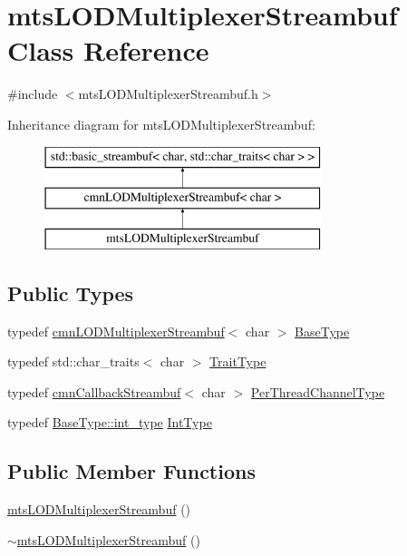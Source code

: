 \hypertarget{classmts_l_o_d_multiplexer_streambuf}{}\section{mts\+L\+O\+D\+Multiplexer\+Streambuf Class Reference}
\label{classmts_l_o_d_multiplexer_streambuf}


{\ttfamily \#include $<$mts\+L\+O\+D\+Multiplexer\+Streambuf.\+h$>$}

Inheritance diagram for mts\+L\+O\+D\+Multiplexer\+Streambuf\+:\begin{figure}[H]
\begin{center}
\leavevmode
\includegraphics[height=3.000000cm]{d3/dd6/classmts_l_o_d_multiplexer_streambuf}
\end{center}
\end{figure}
\subsection*{Public Types}
\begin{DoxyCompactItemize}
\item 
typedef \hyperlink{classcmn_l_o_d_multiplexer_streambuf}{cmn\+L\+O\+D\+Multiplexer\+Streambuf}$<$ char $>$ \hyperlink{classmts_l_o_d_multiplexer_streambuf_a61c8f5498c012321fdc38e97a43393a2}{Base\+Type}
\item 
typedef std\+::char\+\_\+traits$<$ char $>$ \hyperlink{classmts_l_o_d_multiplexer_streambuf_aad2a9ad3c0067d2f8cde938845daa252}{Trait\+Type}
\item 
typedef \hyperlink{classcmn_callback_streambuf}{cmn\+Callback\+Streambuf}$<$ char $>$ \hyperlink{classmts_l_o_d_multiplexer_streambuf_a945f4bdc4f4a79290018377ae3de68e9}{Per\+Thread\+Channel\+Type}
\item 
typedef \hyperlink{classcmn_l_o_d_multiplexer_streambuf_a8d1eadc5cf72b594aa2c2fef6401fe47}{Base\+Type\+::int\+\_\+type} \hyperlink{classmts_l_o_d_multiplexer_streambuf_a21823525be07ef7a8c1c3b053f3fedf2}{Int\+Type}
\end{DoxyCompactItemize}
\subsection*{Public Member Functions}
\begin{DoxyCompactItemize}
\item 
\hyperlink{classmts_l_o_d_multiplexer_streambuf_ac9e2888b131e809c18b29a863c064153}{mts\+L\+O\+D\+Multiplexer\+Streambuf} ()
\item 
\hyperlink{classmts_l_o_d_multiplexer_streambuf_aa4ed91024f1bcb4dc34481a3718cd7de}{$\sim$mts\+L\+O\+D\+Multiplexer\+Streambuf} ()
\end{DoxyCompactItemize}
